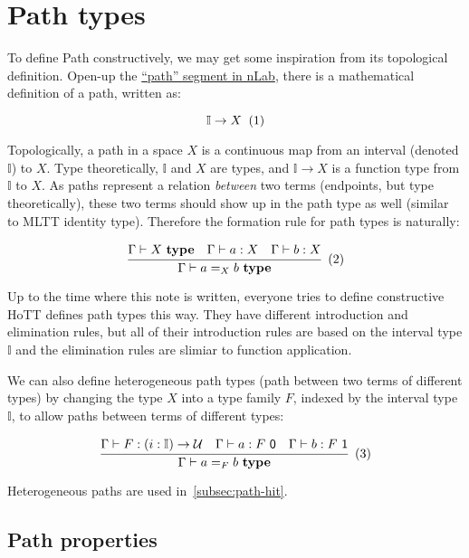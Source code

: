 \section{Path types}
\label{sec:path}

To define Path constructively,
we may get some inspiration from its topological definition.
Open-up the \href{https://ncatlab.org/nlab/show/path}{``path'' segment in nLab},
there is a mathematical definition of a path, written as:

\[
  \mathbb I \rightarrow X
  \xtag
\]

Topologically, a path in a space $X$ is a continuous map
from an interval (denoted $\mathbb I$) to $X$.
Type theoretically, $\mathbb I$ and $X$ are types,
and $\mathbb I \rightarrow X$ is a function type from $\mathbb I$ to $X$.
As paths represent a relation \textit{between} two terms
(endpoints, but type theoretically),
these two terms should show up in the path type as well
(similar to MLTT identity type).
Therefore the formation rule for path types is naturally:

\[
  \cfrac{
    \Gamma \vdash X~\textbf{type}
    \quad
    \Gamma \vdash a : X
    \quad
    \Gamma \vdash b : X
  }{\Gamma \vdash a =_X b~\textbf{type}}
  \xtag
\]

Up to the time where this note is written,
everyone tries to define constructive HoTT defines path types this way.
They have different introduction and elimination rules,
but all of their introduction rules are
based on the interval type $\mathbb I$
and the elimination rules are slimiar to function application.

We can also define heterogeneous path types
(path between two terms of different types)
by changing the type $X$ into a type family $F$,
indexed by the interval type $\mathbb I$,
to allow paths between terms of different types:

\[
  \cfrac{
    \Gamma \vdash F : (i : \mathbb I) \rightarrow \mathcal U
    \quad
    \Gamma \vdash a : F~\textsf 0
    \quad
    \Gamma \vdash b : F~\textsf 1
  }{\Gamma \vdash a =_F b ~\textbf{type}}
  \xtag \label{eqn:hetero-path}
\]

Heterogeneous paths are used in~\cref{subsec:path-hit}.



\subsection{Path properties}
\label{subsec:path-prop}


